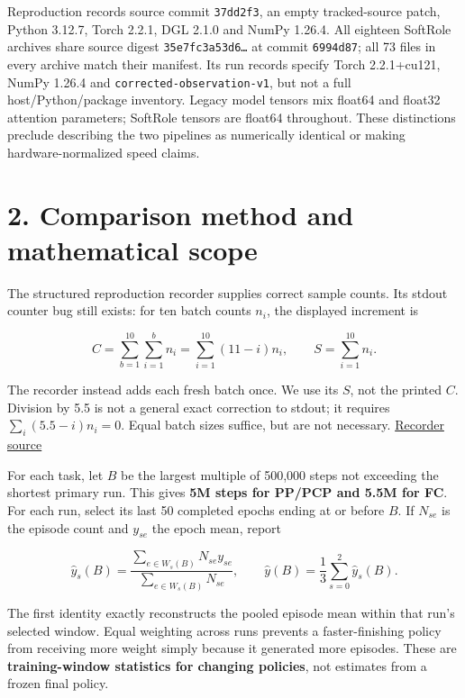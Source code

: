 \documentclass[
  10pt,
]{article}
\begin{document}
Reproduction records source commit \texttt{37dd2f3}, an empty
tracked-source patch, Python 3.12.7, Torch 2.2.1, DGL 2.1.0 and NumPy
1.26.4. All eighteen SoftRole archives share source digest
\texttt{35e7fc3a53d6…} at commit \texttt{6994d87}; all 73 files in every
archive match their manifest. Its run records specify Torch 2.2.1+cu121,
NumPy 1.26.4 and \texttt{corrected-observation-v1}, but not a full
host/Python/package inventory. Legacy model tensors mix float64 and
float32 attention parameters; SoftRole tensors are float64 throughout.
These distinctions preclude describing the two pipelines as numerically
identical or making hardware-normalized speed claims.

\section{2. Comparison method and mathematical
scope}\label{comparison-method-and-mathematical-scope}

The structured reproduction recorder supplies correct sample counts. Its
stdout counter bug still exists: for ten batch counts \(n_i\), the
displayed increment is

\[
C=\sum_{b=1}^{10}\sum_{i=1}^{b}n_i
 =\sum_{i=1}^{10}(11-i)n_i,
\qquad S=\sum_{i=1}^{10}n_i.
\]

The recorder instead adds each fresh batch once. We use its \(S\), not
the printed \(C\). Division by 5.5 is not a general exact correction to
stdout; it requires \(\sum_i(5.5-i)n_i=0\). Equal batch sizes suffice,
but are not necessary. \href{../../hetnet_ext/recording.py}{Recorder
source}

For each task, let \(B\) be the largest multiple of 500,000 steps not
exceeding the shortest primary run. This gives \textbf{5M steps for
PP/PCP and 5.5M for FC}. For each run, select its last 50 completed
epochs ending at or before \(B\). If \(N_{se}\) is the episode count and
\(y_{se}\) the epoch mean, report

\[
\widehat y_s(B)=
\frac{\sum_{e\in W_s(B)}N_{se}y_{se}}
     {\sum_{e\in W_s(B)}N_{se}},
\qquad
\widehat y(B)=\frac{1}{3}\sum_{s=0}^{2}\widehat y_s(B).
\]

The first identity exactly reconstructs the pooled episode mean within
that run's selected window. Equal weighting across runs prevents a
faster-finishing policy from receiving more weight simply because it
generated more episodes. These are \textbf{training-window statistics
for changing policies}, not estimates from a frozen final policy.
\end{document}
